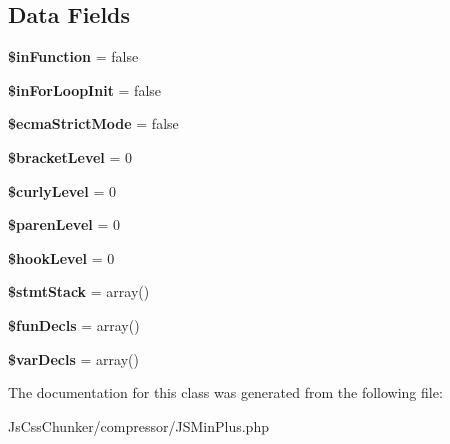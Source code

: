 \subsection*{Data Fields}
\begin{DoxyCompactItemize}
\item 
\hypertarget{class_j_s_compiler_context_acfc794fb43701cfa987b13a99748b697}{
{\bfseries \$inFunction} = false}
\label{class_j_s_compiler_context_acfc794fb43701cfa987b13a99748b697}

\item 
\hypertarget{class_j_s_compiler_context_a69297f76ee3616171189bb2fb9e9ae51}{
{\bfseries \$inForLoopInit} = false}
\label{class_j_s_compiler_context_a69297f76ee3616171189bb2fb9e9ae51}

\item 
\hypertarget{class_j_s_compiler_context_a4f0ae4bf2b21fc20c24f76b765ac2a90}{
{\bfseries \$ecmaStrictMode} = false}
\label{class_j_s_compiler_context_a4f0ae4bf2b21fc20c24f76b765ac2a90}

\item 
\hypertarget{class_j_s_compiler_context_a6bb7a9e563cec7c992021b6c8388130b}{
{\bfseries \$bracketLevel} = 0}
\label{class_j_s_compiler_context_a6bb7a9e563cec7c992021b6c8388130b}

\item 
\hypertarget{class_j_s_compiler_context_ab69632dcb26284dba30edc49a38fde02}{
{\bfseries \$curlyLevel} = 0}
\label{class_j_s_compiler_context_ab69632dcb26284dba30edc49a38fde02}

\item 
\hypertarget{class_j_s_compiler_context_aa31c2c1020c976d50761c9ca98a6f322}{
{\bfseries \$parenLevel} = 0}
\label{class_j_s_compiler_context_aa31c2c1020c976d50761c9ca98a6f322}

\item 
\hypertarget{class_j_s_compiler_context_a50fd205d2bf8436545af973f17682347}{
{\bfseries \$hookLevel} = 0}
\label{class_j_s_compiler_context_a50fd205d2bf8436545af973f17682347}

\item 
\hypertarget{class_j_s_compiler_context_a39e98d8177fb61357ba1cb927b16f4f3}{
{\bfseries \$stmtStack} = array()}
\label{class_j_s_compiler_context_a39e98d8177fb61357ba1cb927b16f4f3}

\item 
\hypertarget{class_j_s_compiler_context_a4917da36d7c00622b2efd8adc064ad43}{
{\bfseries \$funDecls} = array()}
\label{class_j_s_compiler_context_a4917da36d7c00622b2efd8adc064ad43}

\item 
\hypertarget{class_j_s_compiler_context_ae759d20ff42c337091a09b879da0f8cb}{
{\bfseries \$varDecls} = array()}
\label{class_j_s_compiler_context_ae759d20ff42c337091a09b879da0f8cb}

\end{DoxyCompactItemize}


The documentation for this class was generated from the following file:\begin{DoxyCompactItemize}
\item 
JsCssChunker/compressor/JSMinPlus.php\end{DoxyCompactItemize}
